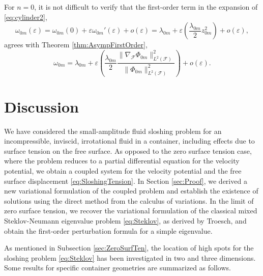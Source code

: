 \documentclass[letterpaper, 12pt]{amsart}
\newcommand{\F}{\mathcal{F}}
\begin{document}
For $n=0$, it is not difficult to verify that the first-order term in the expansion  of \eqref{eq:cylinder2}, 
\[ \omega_{0m}(\varepsilon ) 
= \omega_{0m}(0)  + \varepsilon \omega_{0m}'(\varepsilon )  + o(\varepsilon ) 
= \lambda_{0m} + \varepsilon  \left(\frac{\lambda_{0m}}{2}z_{0m}^2\right) + o(\varepsilon ), 
\]
agrees with  Theorem \ref{thm:AsympFirstOrder}, 
\[ \omega_{0m} =\lambda_{0m} + \varepsilon   \left(\frac{\lambda_{0m}}{2}\frac{\|\nabla_\F\Phi_{0m}\|_{L^2(\F)}^2}{\|\Phi_{0m}\|_{L^2(\F)}^2}\right) + o(\varepsilon ). \]


\section{Discussion} \label{sec:disc}
We have considered the small-amplitude fluid sloshing problem for an incompressible, inviscid, irrotational fluid in a container, including effects due to surface tension on the free surface.  As opposed to the zero surface tension case, where the problem reduces to a partial differential equation for the velocity potential, we obtain a coupled system for the velocity potential and the free surface displacement \eqref{eq:SloshingTension}. In Section \ref{sec:Proof}, we derived a new variational formulation of the coupled problem and establish the existence of solutions using the direct method from the calculus of variations. In the limit of zero surface tension, we recover the variational formulation of the classical mixed Steklov-Neumann eigenvalue problem \eqref{eq:Steklov}, as derived by Troesch, and obtain the first-order perturbation formula for a simple eigenvalue. 

As mentioned in Subsection \ref{sec:ZeroSurfTen}, the location of high spots for the sloshing problem \eqref{eq:Steklov} has been  investigated in two and three dimensions. Some results for specific container geometries   are summarized as follows. 
\end{document}
